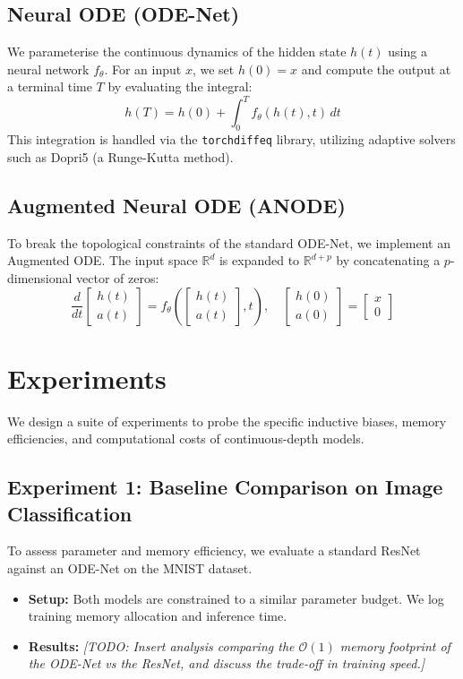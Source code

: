 \documentclass{article}
\begin{document}
\subsection{Neural ODE (ODE-Net)}
We parameterise the continuous dynamics of the hidden state $h(t)$ using a neural network $f_{\theta}$. For an input $x$, we set $h(0) = x$ and compute the output at a terminal time $T$ by evaluating the integral:
\begin{equation}
    h(T) = h(0) + \int_{0}^{T} f_{\theta}(h(t), t) \, dt
\end{equation}
This integration is handled via the \texttt{torchdiffeq} library, utilizing adaptive solvers such as Dopri5 (a Runge-Kutta method). 

\subsection{Augmented Neural ODE (ANODE)}
To break the topological constraints of the standard ODE-Net, we implement an Augmented ODE. The input space $\mathbb{R}^d$ is expanded to $\mathbb{R}^{d+p}$ by concatenating a $p$-dimensional vector of zeros:
\begin{equation}
    \frac{d}{dt} \begin{bmatrix} h(t) \\ a(t) \end{bmatrix} = f_{\theta} \left( \begin{bmatrix} h(t) \\ a(t) \end{bmatrix}, t \right), \quad \begin{bmatrix} h(0) \\ a(0) \end{bmatrix} = \begin{bmatrix} x \\ 0 \end{bmatrix}
\end{equation}

\section{Experiments}

We design a suite of experiments to probe the specific inductive biases, memory efficiencies, and computational costs of continuous-depth models.

\subsection{Experiment 1: Baseline Comparison on Image Classification}
To assess parameter and memory efficiency, we evaluate a standard ResNet against an ODE-Net on the MNIST dataset. 
\begin{itemize}
    \item \textbf{Setup:} Both models are constrained to a similar parameter budget. We log training memory allocation and inference time.
    \item \textbf{Results:} \textit{[TODO: Insert analysis comparing the $\mathcal{O}(1)$ memory footprint of the ODE-Net vs the ResNet, and discuss the trade-off in training speed.]}
\end{itemize}
\end{document}
